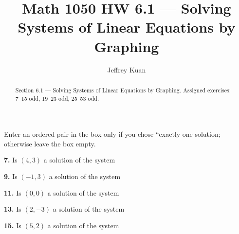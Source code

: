 \documentclass{ximera}
\author{Jeffrey Kuan}
\title{Math 1050 HW 6.1 --- Solving Systems of Linear Equations by Graphing}
\begin{document}
\begin{abstract}
    Section 6.1 --- Solving Systems of Linear Equations by Graphing.
    Assigned exercises: 7–15 odd, 19–23 odd, 25–53 odd.
\end{abstract}

\maketitle

Enter an ordered pair in the box only if you chose ``exactly one solution; otherwise leave the box empty.

\begin{problem}
\textbf{7.} Is $(4, 3)$ a solution of the system 

\begin{multipleChoice}
\end{multipleChoice}
\end{problem}

\begin{problem}
\textbf{9.} Is $(-1, 3)$ a solution of the system 

\begin{multipleChoice}
\end{multipleChoice}
\end{problem}

\begin{problem}
\textbf{11.} Is $(0, 0)$ a solution of the system 

\begin{multipleChoice}
\end{multipleChoice}
\end{problem}

\begin{problem}
\textbf{13.} Is $(2, -3)$ a solution of the system 

\begin{multipleChoice}
\end{multipleChoice}
\end{problem}

\begin{problem}
\textbf{15.} Is $(5, 2)$ a solution of the system 

\begin{multipleChoice}
\end{multipleChoice}
\end{problem}
\end{document}
